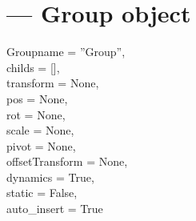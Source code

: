 
\section{ ---
         Group object}

\begin{classdesc}{Group}{name = ''Group'',\\ 
                       childs = [],\\
                       transform = None,\\
                       pos = None,\\
                       rot = None,\\
                       scale = None,\\
                       pivot = None,\\
                       offsetTransform = None,\\
                       dynamics = True,\\
                       static = False,\\
                       auto_insert = True}

\end{classdesc}


